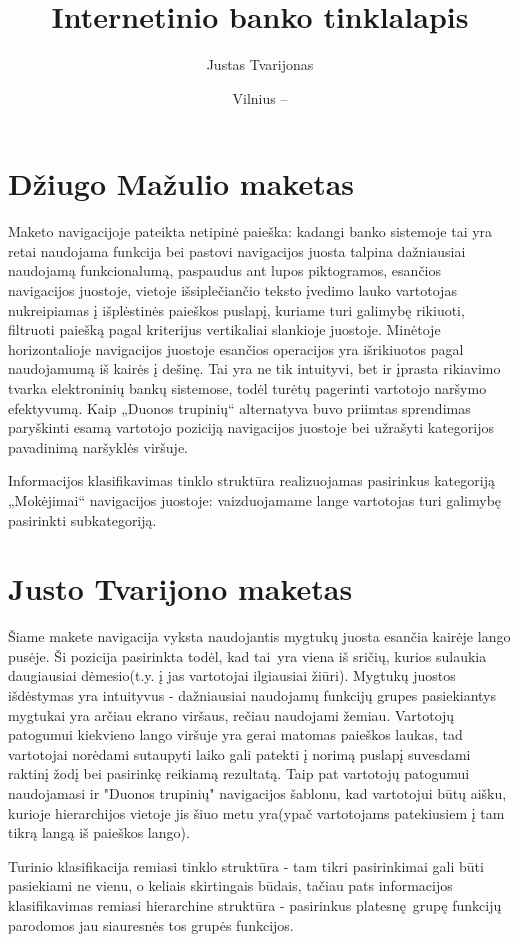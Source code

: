 \documentclass{VUMIFPSkursinis}
\title{Internetinio banko tinklalapis}
\author{Justas Tvarijonas}
\date{Vilnius – \the\year}
\begin{document}
\maketitle
\tableofcontents
\section{Džiugo Mažulio maketas}
Maketo navigacijoje pateikta netipinė paieška: kadangi banko sistemoje tai yra retai naudojama funkcija bei pastovi navigacijos juosta talpina dažniausiai naudojamą funkcionalumą, paspaudus ant lupos piktogramos, esančios navigacijos juostoje, vietoje išsiplečiančio teksto įvedimo lauko vartotojas nukreipiamas į išplėstinės paieškos puslapį, kuriame turi galimybę rikiuoti, filtruoti paiešką pagal kriterijus vertikaliai slankioje juostoje. Minėtoje horizontalioje navigacijos juostoje esančios operacijos yra išrikiuotos pagal naudojamumą iš kairės į dešinę. Tai yra ne tik intuityvi, bet ir įprasta rikiavimo tvarka elektroninių bankų sistemose, todėl turėtų pagerinti vartotojo naršymo efektyvumą. Kaip „Duonos trupinių“ alternatyva buvo priimtas sprendimas paryškinti esamą vartotojo poziciją navigacijos juostoje bei užrašyti kategorijos pavadinimą naršyklės viršuje. \par Informacijos klasifikavimas tinklo struktūra realizuojamas pasirinkus kategoriją „Mokėjimai“ navigacijos juostoje: vaizduojamame lange vartotojas turi galimybę pasirinkti subkategoriją.

\section{Justo Tvarijono maketas}
Šiame makete navigacija vyksta naudojantis mygtukų juosta esančia kairėje lango pusėje. Ši pozicija pasirinkta todėl, kad tai yra viena iš sričių, kurios sulaukia daugiausiai dėmesio(t.y. į jas vartotojai ilgiausiai žiūri). Mygtukų juostos išdėstymas yra intuityvus - dažniausiai naudojamų funkcijų grupes pasiekiantys mygtukai yra arčiau ekrano viršaus, rečiau naudojami žemiau. Vartotojų patogumui kiekvieno lango viršuje yra gerai matomas paieškos laukas, tad vartotojai norėdami sutaupyti laiko gali patekti į norimą puslapį suvesdami raktinį žodį bei pasirinkę reikiamą rezultatą. Taip pat vartotojų patogumui naudojamasi ir "Duonos trupinių" navigacijos šablonu, kad vartotojui būtų aišku, kurioje hierarchijos vietoje jis šiuo metu yra(ypač vartotojams patekiusiem į tam tikrą langą iš paieškos lango). \par Turinio klasifikacija remiasi tinklo struktūra - tam tikri pasirinkimai gali būti pasiekiami ne vienu, o keliais skirtingais būdais, tačiau pats informacijos klasifikavimas remiasi hierarchine struktūra - pasirinkus platesnę grupę funkcijų parodomos jau siauresnės tos grupės funkcijos.
\end{document}
